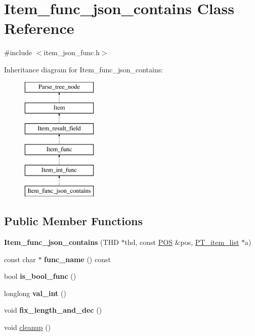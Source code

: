 \hypertarget{classItem__func__json__contains}{}\section{Item\+\_\+func\+\_\+json\+\_\+contains Class Reference}
\label{classItem__func__json__contains}


{\ttfamily \#include $<$item\+\_\+json\+\_\+func.\+h$>$}

Inheritance diagram for Item\+\_\+func\+\_\+json\+\_\+contains\+:\begin{figure}[H]
\begin{center}
\leavevmode
\includegraphics[height=6.000000cm]{classItem__func__json__contains}
\end{center}
\end{figure}
\subsection*{Public Member Functions}
\begin{DoxyCompactItemize}
\item 
\mbox{\label{classItem__func__json__contains_a4caf5eb24ebd75d61540fef4ab9adb2b}} 
{\bfseries Item\+\_\+func\+\_\+json\+\_\+contains} (T\+HD $\ast$thd, const \mbox{\hyperlink{structYYLTYPE}{P\+OS}} \&pos, \mbox{\hyperlink{classPT__item__list}{P\+T\+\_\+item\+\_\+list}} $\ast$a)
\item 
\mbox{\label{classItem__func__json__contains_a62e4b0f0f5afea16b099d2be39f3a23c}} 
const char $\ast$ {\bfseries func\+\_\+name} () const
\item 
\mbox{\label{classItem__func__json__contains_a1afff43f3ce0823ce75c9070b3868adf}} 
bool {\bfseries is\+\_\+bool\+\_\+func} ()
\item 
\mbox{\label{classItem__func__json__contains_a34c9b538a03ed4910fe9ea680fecd1a4}} 
longlong {\bfseries val\+\_\+int} ()
\item 
\mbox{\label{classItem__func__json__contains_aba91ed8aaf66ab36a4d00b8839313f47}} 
void {\bfseries fix\+\_\+length\+\_\+and\+\_\+dec} ()
\item 
void \mbox{\hyperlink{classItem__func__json__contains_a9a8d40725abf7916c5e194c634edc27a}{cleanup}} ()
\end{DoxyCompactItemize}
